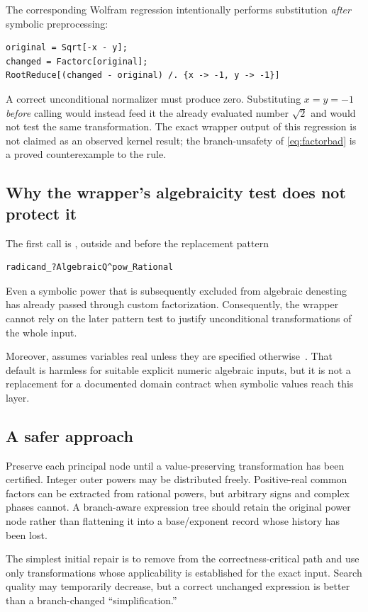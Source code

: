 \documentclass[11pt,letterpaper]{article}
\newcommand{\code}[1]{\texttt{\detokenize{#1}}}
\theoremstyle{definition}
\begin{document}
The corresponding Wolfram regression intentionally performs substitution
\emph{after} symbolic preprocessing:
\begin{lstlisting}
original = Sqrt[-x - y];
changed = Factorc[original];
RootReduce[(changed - original) /. {x -> -1, y -> -1}]
\end{lstlisting}
A correct unconditional normalizer must produce zero. Substituting $x=y=-1$
\emph{before} calling \code{Factorc} would instead feed it the already evaluated
number $\sqrt2$ and would not test the same transformation. The exact wrapper
output of this regression is not claimed as an observed kernel result; the
branch-unsafety of \eqref{eq:factorbad} is a proved counterexample to the rule.

\subsection{Why the wrapper's algebraicity test does not protect it}
The first call is \code{Factorc[expr]}, outside and before the replacement pattern
\begin{lstlisting}
radicand_?AlgebraicQ^pow_Rational
\end{lstlisting}
Even a symbolic power that is subsequently
excluded from algebraic denesting has already passed through custom factorization.
Consequently, the wrapper cannot rely on the later pattern test to justify
unconditional transformations of the whole input.

Moreover, \code{ComplexExpand} assumes variables real unless they are specified
otherwise~\cite{doc-complexexpand}. That default is harmless for suitable explicit
numeric algebraic inputs, but it is not a replacement for a documented domain
contract when symbolic values reach this layer.

\subsection{A safer approach}
Preserve each principal \code{Power} node until a value-preserving transformation
has been certified. Integer outer powers may be distributed freely. Positive-real
common factors can be extracted from rational powers, but arbitrary signs and
complex phases cannot. A branch-aware expression tree should retain the original
power node rather than flattening it into a base/exponent record whose history has
been lost.

The simplest initial repair is to remove \code{Factorc} from the correctness-critical
path and use only transformations whose applicability is established for the exact
input. Search quality may temporarily decrease, but a correct unchanged expression
is better than a branch-changed ``simplification.''
\end{document}
